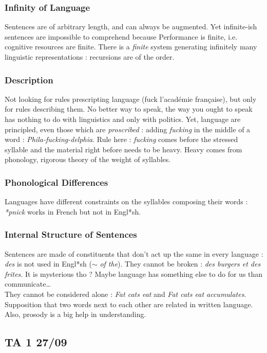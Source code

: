 \documentclass{cours}
\begin{document}
\subsubsection{Infinity of Language}
Sentences are of arbitrary length, and can always be augmented. Yet infinite-ish sentences are impossible to comprehend because Performance is finite, i.e. cognitive resources are finite. There is a \textit{finite} system generating infinitely many linguistic representations\! : recursions are of the order.
\subsubsection{Description}
Not looking for rules prescripting language (fuck l'académie française), but only for rules describing them. No better way to speak, the way you ought to speak has nothing to do with linguistics and only with politics. Yet, language are principled, even those which are \textit{proscribed}\! : adding \textit{fucking} in the middle of a word\! : \textit{Phila-fucking-delphia}. Rule here\! : \textit{fucking} comes before the stressed syllable and the material right before needs to be heavy. Heavy comes from phonology, rigorous theory of the weight of syllables.
\subsubsection{Phonological Differences}
Languages have different constraints on the syllables composing their words\! : \textit{*pnick} works in French but not in Engl*sh.
\subsubsection{Internal Structure of Sentences}
Sentences are made of constituents that don't act up the same in every language\! : \textit{des} is not used in Engl*sh ($\sim$ \textit{of the}). They cannot be broken\! : \textit{des burgers et des frites}. It is mysterious tho ? Maybe language has something else to do for us than communicate\ldots\\
They cannot be considered alone\! : \textit{Fat cats eat} and \textit{Fat cats eat accumulates}. Supposition that two words next to each other are related in written language. Also, prosody is a big help in understanding.

\subsection{TA 1 27/09}
\end{document}
